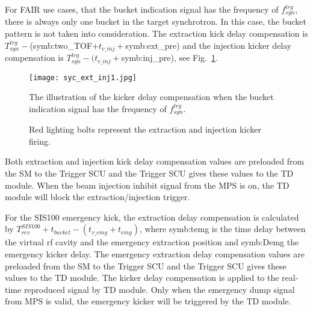 For FAIR use cases, that the bucket indication signal has the frequency of $f_{\mathit{syn}}^{\mathit{trg}}$, there is always only one bucket in the target synchrotron. In this case, the bucket pattern is not taken into consideration. The extraction kick delay compensation is $T_{\mathit{syn}}^{\mathit{trg}} -$(\gls{symb:two_TOF}$ + t_{v\_inj}+ $\gls{symb:ext_pre}) and the injection kicker delay compensation is $T_{\mathit{syn}}^{\mathit{trg}} - (t_{v\_inj}+ $\gls{symb:inj_pre}), see Fig.~\ref{ext_inj_kicker1}. 
\begin{figure}[!htb]
   \centering   
   \texttt{[image: syc\_ext\_inj1.jpg]}
   \caption{The illustration of the kicker delay compensation when the bucket indication signal has the frequency of $f_{\mathit{syn}}^{\mathit{trg}}$.}
	\caption*{Red lighting bolts represent the extraction and injection kicker firing.}
   \label{ext_inj_kicker1}
\end{figure}



Both extraction and injection kick delay compensation values are preloaded from the SM to the Trigger SCU and the Trigger SCU gives these values to the TD module. When the beam injection inhibit signal from the MPS is on, the TD module will block the extraction/injection trigger.

For the SIS100 emergency kick, the extraction delay compensation is calculated by $T_{\mathit{rev}}^{\mathit{SIS100}} + t_{bucket} - (t_{v\_emg} + t_{emg})$, where \gls{symb:temg} is the time delay between the virtual rf cavity and the emergency extraction position and \gls{symb:Demg} the emergency kicker delay. The emergency extraction delay compensation values are preloaded from the SM to the Trigger SCU and the Trigger SCU gives these values to the TD module. The kicker delay compensation is applied to the real-time reproduced signal by TD module. Only when the emergency dump signal from MPS is valid, the emergency kicker will be triggered by the TD module.


